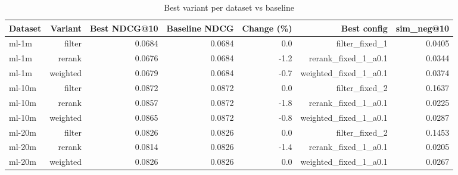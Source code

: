 \begin{table}[ht]
\centering
\caption{Best variant per dataset vs baseline}
\begin{tabular}{lrrrrrr}
\toprule
Dataset & Variant & Best NDCG@10 & Baseline NDCG & Change (\%) & Best config & sim\_neg@10 \\
\midrule
ml-1m & filter & 0.0684 & 0.0684 & 0.0 & filter\_fixed\_1 & 0.0405 \\
ml-1m & rerank & 0.0676 & 0.0684 & -1.2 & rerank\_fixed\_1\_a0.1 & 0.0344 \\
ml-1m & weighted & 0.0679 & 0.0684 & -0.7 & weighted\_fixed\_1\_a0.1 & 0.0374 \\
ml-10m & filter & 0.0872 & 0.0872 & 0.0 & filter\_fixed\_2 & 0.1637 \\
ml-10m & rerank & 0.0857 & 0.0872 & -1.8 & rerank\_fixed\_1\_a0.1 & 0.0225 \\
ml-10m & weighted & 0.0865 & 0.0872 & -0.8 & weighted\_fixed\_1\_a0.1 & 0.0287 \\
ml-20m & filter & 0.0826 & 0.0826 & 0.0 & filter\_fixed\_2 & 0.1453 \\
ml-20m & rerank & 0.0814 & 0.0826 & -1.4 & rerank\_fixed\_1\_a0.1 & 0.0205 \\
ml-20m & weighted & 0.0826 & 0.0826 & 0.0 & weighted\_fixed\_1\_a0.1 & 0.0267 \\
\bottomrule
\end{tabular}
\end{table}